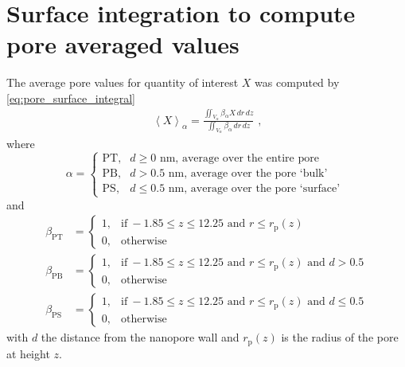 \clearpage

\section{Surface integration to compute pore averaged values}
%

The average pore values for quantity of interest $X$ was computed by \cref{eq:pore_surface_integral}
%
\begin{align}\label{eq:pore_surface_integral}
  \left< X \right>_{\alpha} =
    \displaystyle\frac{\displaystyle\iint_{V_{\alpha}} \beta_{\alpha} X \,dr\,dz}
                      {\displaystyle\iint_{V_{\alpha}} \beta_{\alpha} \,dr\,dz}
  \text{ ,}
\end{align}
%
where
%
\begin{equation}
  \alpha=
  \begin{cases}
    \text{PT}, & d \ge 0  \text{~nm} \text{, average over the entire pore} \\
    \text{PB}, & d > 0.5  \text{~nm} \text{, average over the pore `bulk' }  \\
    \text{PS}, & d \le 0.5\text{~nm} \text{, average over the pore `surface' }
  \end{cases}
\end{equation}
%
and
%
\begin{align}
  \beta_{\text{PT}} &=
  \begin{cases}
    1, & \text{if}\ -1.85\le z \le 12.25  \text{ and } r \le r_\text{p}(z) \\
    0, & \text{otherwise}
  \end{cases} \\
  \beta_{\text{PB}} &=
  \begin{cases}
  1, & \text{if}\ -1.85\le z \le 12.25  \text{ and } r \le r_\text{p}(z) \text{ and } d > 0.5 \\
  0, & \text{otherwise}
  \end{cases} \\
  \beta_{\text{PS}} &=
  \begin{cases}
  1, & \text{if}\ -1.85\le z \le 12.25  \text{ and } r \le r_\text{p}(z) \text{ and } d \le 0.5 \\
  0, & \text{otherwise}
  \end{cases}
\end{align}
%
with $d$ the distance from the nanopore wall and $r_\text{p}(z)$ is the radius of the pore at height $z$.

\cleardoublepage


